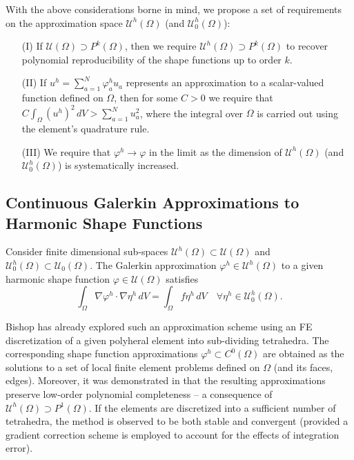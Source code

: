 	With the above considerations borne in mind, we propose a set of requirements on the approximation space $\mathcal{U}^h (\Omega)$ (and $\mathcal{U}^h_0 (\Omega)$):
	\begin{itemize}
		\item[(I)] If $\mathcal{U} (\Omega) \supset P^{k} (\Omega)$, then we require $\mathcal{U}^h (\Omega) \supset P^{k} (\Omega)$ to recover polynomial reproducibility of the shape functions up to order $k$.
		\item[(II)] If $u^h = \sum_{a=1}^N \varphi^h_a u_a$ represents an approximation to a scalar-valued function defined on $\Omega$, then for some $C>0$ we require that $C \int_{\Omega} (u^h)^2 \, dV > \sum_{a=1}^N u^2_a$, where the integral over $\Omega$ is carried out using the element's quadrature rule.
		\item[(III)] We require that $\varphi^h \rightarrow \varphi$ in the limit as the dimension of $\mathcal{U}^h (\Omega)$ (and $\mathcal{U}^h_0 (\Omega)$) is systematically increased.
	\end{itemize}
	
\subsection*{Continuous Galerkin Approximations to \\ Harmonic Shape Functions}

	Consider finite dimensional sub-spaces $\mathcal{U}^h (\Omega) \subset \mathcal{U} (\Omega)$ and $\mathcal{U}^h_0 (\Omega) \subset \mathcal{U}_0 (\Omega)$. The Galerkin approximation $\varphi^h \in \mathcal{U}^h (\Omega)$ to a given harmonic shape function $\varphi \in \mathcal{U} (\Omega)$ satisfies
	\begin{equation}
		\int_\Omega \nabla \varphi^h \cdot \nabla \eta^h \, dV = \int_\Omega f \eta^h \, dV \quad \forall \eta^h \in \mathcal{U}^h_0 (\Omega).
		\label{eq:weak_poisson}
	\end{equation}
	
	Bishop has already explored such an approximation scheme using an FE discretization of a given polyheral element into sub-dividing tetrahedra. The corresponding shape function approximations $\varphi^h \subset C^0 (\Omega)$ are obtained as the solutions to a set of local finite element problems defined on $\Omega$ (and its faces, edges). Moreover, it was demonstrated in \cite{Bishop:14} that the resulting approximations preserve low-order polynomial completeness -- a consequence of $\mathcal{U}^h (\Omega) \supset P^{1} (\Omega)$. If the elements are discretized into a sufficient number of tetrahedra, the method is observed to be both stable and convergent (provided a gradient correction scheme is employed to account for the effects of integration error).
	
